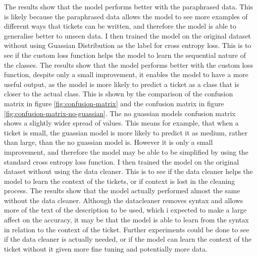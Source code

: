 \documentclass{UoYCSproject}
\begin{document}
    The results show that the model performs better with the paraphrased data. This is likely because the paraphrased data allows the model to see more examples of different ways that tickets can be written, and therefore the model is able to generalise better to unseen data.
    I then trained the model on the original dataset without using Guassian Distribution as the label for cross entropy loss.  This is to see if the custom loss function helps the model to learn the sequential nature of the classes.
    The results show that the model performs better with the custom loss function, despite only a small improvement, it enables the model to have a more useful output, as the model is more likely to predict a ticket as a class that is closer to the actual class. This is shown by the comparison of the confusion matrix in figure \ref{fig:confusion-matrix} and the confusion matrix in figure \ref{fig:confusion-matrix-no-guassian}. The no guassian models confusion matrix shows a slightly wider spread of values. This means for example, that when a ticket is small, the guassian model is more likely to predict it as medium, rather than large, than the no guassian model is.
    However it is only a small improvement, and therefore the model may be able to be simplified by using the standard cross entropy loss function.
    I then trained the model on the original dataset without using the data cleaner. This is to see if the data cleaner helps the model to learn the context of the tickets, or if context is lost in the cleaning process.
    The results show that the model actually performed almost the same without the data cleaner. Although the datacleaner removes syntax and allows more of the text of the description to be used, which i expected to make a large affect on the accuracy, it may be that the model is able to learn from the syntax in relation to the context of the ticket.
    Further experiments could be done to see if the data cleaner is actually needed, or if the model can learn the context of the ticket without it given more fine tuning and potentially more data.










\end{document}
